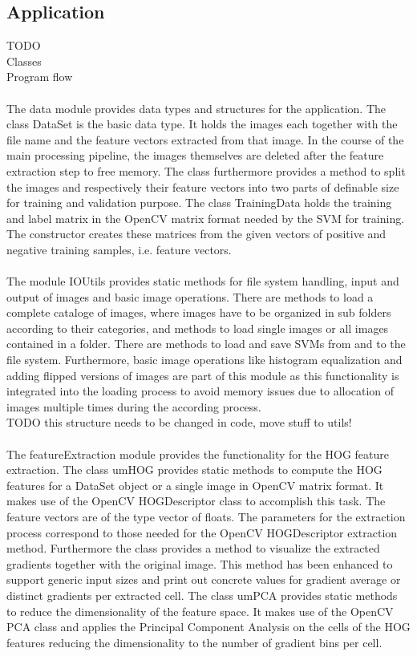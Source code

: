 \subsection{Application}

TODO
\\
Classes
\\
Program flow
\\
\\
The data module provides data types and structures for the application. The class DataSet is the basic data type. It holds the images each together with the file name and the feature vectors extracted from that image. In the course of the main processing pipeline, the images themselves are deleted after the feature extraction step to free memory. The class furthermore provides a method to split the images and respectively their feature vectors into two parts of definable size for training and validation purpose. The class TrainingData holds the training and label matrix in the OpenCV matrix format needed by the SVM for training. The constructor creates these matrices from the given vectors of positive and negative training samples, i.e. feature vectors.
\\
\\
The module IOUtils provides static methods for file system handling, input and output of images and basic image operations. There are methods to load a complete cataloge of images, where images have to be organized in sub folders according to their categories, and methods to load single images or all images contained in a folder. There are methods to load and save SVMs from and to the file system. Furthermore, basic image operations like histogram equalization and adding flipped versions of images are part of this module as this functionality is integrated into the loading process to avoid memory issues due to allocation of images multiple times during the according process.
\\
TODO this structure needs to be changed in code, move stuff to utils!
\\
\\
The featureExtraction module provides the functionality for the HOG feature extraction. The class umHOG provides static methods to compute the HOG features for a DataSet object or a single image in OpenCV matrix format. It makes use of the OpenCV HOGDescriptor class to accomplish this task. The feature vectors are of the type vector of floats. The parameters for the extraction process correspond to those needed for the OpenCV HOGDescriptor extraction method. Furthermore the class provides a method to visualize the extracted gradients together with the original image. This method  has been enhanced to support generic input sizes and print out concrete values for gradient average or distinct gradients per extracted cell. The class umPCA provides static methods to reduce the dimensionality of the feature space. It makes use of the OpenCV PCA class and applies the Principal Component Analysis on the cells of the HOG features reducing the dimensionality to the number of gradient bins per cell.
